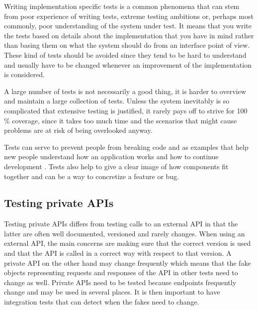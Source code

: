 \documentclass[11pt]{article}
\begin{document}
Writing implementation specific tests is a common phenomena that can stem from poor experience of writing tests, extreme testing ambitions or, perhaps most commonly, poor understanding of the system under test. It means that you write the tests based on details about the implementation that you have in mind rather than basing them on what the system should do from an interface point of view. These kind of tests should be avoided since they tend to be hard to understand and usually have to be changed whenever an improvement of the implementation is considered.

A large number of tests is not necessarily a good thing, it is harder to overview and maintain a large collection of tests. Unless the system inevitably is so complicated that extensive testing is justified, it rarely pays off to strive for 100 \% coverage, since it takes too much time and the scenarios that might cause problems are at risk of being overlooked anyway. \cite[question~28]{Edelstam}

Tests can serve to prevent people from breaking code and as examples that help new people understand how an application works and how to continue development \cite[questions~31-32]{Edelstam}. Tests also help to give a clear image of how components fit together and can be a way to concretize a feature or bug.

\subsection{Testing private APIs}

Testing private APIs differs from testing calls to an external API in that the latter are often well documented, versioned and rarely changes. When using an external API, the main concerns are making sure that the correct version is used and that the API is called in a correct way with respect to that version. A private API on the other hand may change frequently which means that the fake objects representing requests and responses of the API in other tests need to change as well. Private APIs need to be tested because endpoints frequently change and may be used in several places. It is then important to have integration tests that can detect when the fakes need to change. \cite[questions~34,~36]{Edelstam}
\end{document}
